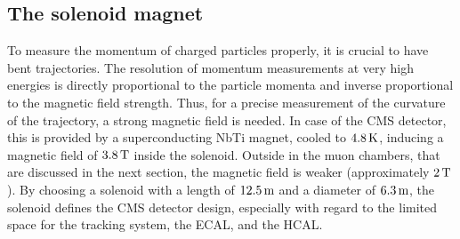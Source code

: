 \subsection{The solenoid magnet}
To measure the momentum of charged particles properly, it is crucial to have bent trajectories. The resolution of momentum measurements at very high energies is directly proportional to the particle momenta and inverse proportional to the magnetic field strength. Thus, for a precise measurement of the curvature of the trajectory, a strong magnetic field is needed. In case of the CMS detector, this is provided by a superconducting NbTi magnet, cooled to $4.8\,\text{K}$, inducing a magnetic field of $3.8\,\text{T}$ inside the solenoid. Outside in the muon chambers, that are discussed in the next section, the magnetic field is weaker (approximately $2\,\text{T}$). By choosing a solenoid with a length of $12.5\,\text{m}$ and a diameter of $6.3\,\text{m}$, the solenoid defines the CMS detector design, especially with regard to the limited space for the tracking system, the ECAL, and the HCAL.



